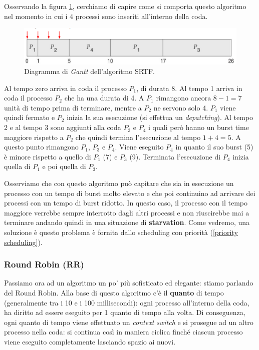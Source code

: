 Osservando la figura \ref{fig:SRTF}, cerchiamo di capire come si comporta questo algoritmo nel momento in cui i 4 processi sono inseriti all'interno della coda.
\begin{figure}[h]
    \centering
    \includegraphics[width = .75\textwidth]{../res/imgs/CPU scheduling/SRTF.png}
    \caption{Diagramma di \textit{Gantt} dell'algoritmo SRTF.}
    \label{fig:SRTF}
\end{figure}
Al tempo zero arriva in coda il processo $P_1$, di durata 8. Al tempo 1 arriva in coda il processo $P_2$ che ha una durata di 4. A $P_1$ rimangono ancora $8 - 1 = 7$ unità di tempo prima di terminare, mentre a $P_2$ ne servono solo 4. $P_1$ viene quindi fermato e $P_2$ inizia la sua esecuzione (si effettua un \textit{depatching}). Al tempo 2 e al tempo 3 sono aggiunti alla coda $P_3$ e $P_4$ i quali però hanno un burst time maggiore rispetto a $P_2$ che quindi termina l'esecuzione al tempo $1 + 4 = 5$. A questo punto rimangono $P_1$, $P_3$ e $P_4$. Viene eseguito $P_4$ in quanto il suo burst (5) è minore rispetto a quello di $P_1$ (7) e $P_3$ (9). Terminata l'esecuzione di $P_4$ inizia quella di $P_1$ e poi quella di $P_3$.

Osserviamo che con questo algoritmo può capitare che sia in esecuzione un processo con un tempo di burst molto elevato e che poi continuino ad arrivare dei processi con un tempo di burst ridotto. In questo caso, il processo con il tempo maggiore verrebbe sempre interrotto dagli altri processi e non riuscirebbe mai a terminare andando quindi in una situazione di \textbf{starvation}. Come vedremo, una soluzione è questo problema è fornita dallo scheduling con priorità (\ref{priority scheduling}).

% 
\subsubsection{Round Robin (RR)}\label{RR}
Passiamo ora ad un algoritmo un po' più sofisticato ed elegante: stiamo parlando del Round Robin. Alla base di questo algoritmo c'è il \textbf{quanto} di tempo (generalmente tra i 10 e i 100 millisecondi): ogni processo all'interno della coda, ha diritto ad essere eseguito per 1 quanto di tempo alla volta. Di conseguenza, ogni quanto di tempo viene effettuato un \textit{context switch} e si prosegue ad un altro processo nella coda: si continua così in maniera ciclica finché ciascun processo viene eseguito completamente lasciando spazio ai nuovi.

